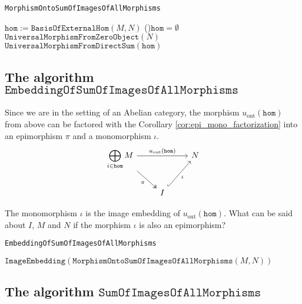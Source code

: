 \begin{algorithm}[H]\capstart
    \caption{\texttt{MorphismOntoSumOfImagesOfAllMorphisms}}\label{algo:MorphismOntoSumOfImagesOfAllMorphisms}
	\BlankLine
	$\mathtt{hom} := \mathtt{BasisOfExternalHom}( M, N )$\;
	\If(){$\mathtt{hom} = \emptyset$}{
	    \Return $\mathtt{UniversalMorphismFromZeroObject}( N )$\;
	}
	\BlankLine
	\Return $\mathtt{UniversalMorphismFromDirectSum}( \mathtt{hom} )$\;
\end{algorithm}

\subsection{The algorithm $\mathtt{EmbeddingOfSumOfImagesOfAllMorphisms}$}

Since we are in the setting of an Abelian category, the morphism $u_{\text{out}}(\mathtt{hom})$ from above can
be factored with the Corollary \ref{cor:epi_mono_factorization} into an epimorphism $\pi$ and a monomorphism $\iota$.
\[
\begin{tikzcd}
\displaystyle{\bigoplus_{i\in \mathtt{hom}} M} \arrow[rr, "u_{\text{out}}(\mathtt{hom})"] \arrow[rd, "\pi"', two heads] &                              & N \\
                                                                                                            & I \arrow[ru, "\iota"', hook] &  
\end{tikzcd}
\]

The monomorphism $\iota$ is the image embedding of $u_{\text{out}}(\mathtt{hom})$. What can be said about $I$, $M$ and $N$ if the
morphism $\iota$ is also an epimorphism?

\begin{algorithm}[H]\capstart
    \caption{\texttt{EmbeddingOfSumOfImagesOfAllMorphisms}}\label{algo:EmbeddingOfSumOfImagesOfAllMorphisms}
	\BlankLine
	\Return $\mathtt{ImageEmbedding}( \mathtt{MorphismOntoSumOfImagesOfAllMorphisms}( M, N ) )$\;
\end{algorithm}

\subsection{The algorithm $\mathtt{SumOfImagesOfAllMorphisms}$}

